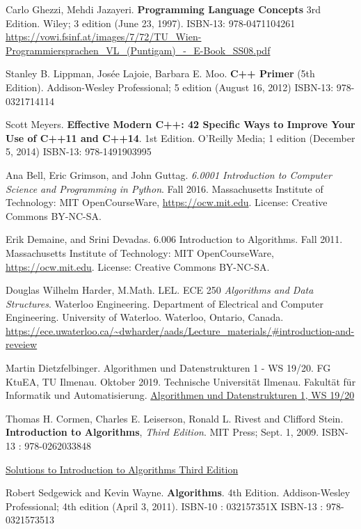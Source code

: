 \documentclass[10pt]{amsart}
\begin{document}
\begin{thebibliography}{9}
Carlo Ghezzi, Mehdi Jazayeri.  \textbf{Programming Language Concepts} 3rd Edition.  Wiley; 3 edition (June 23, 1997).  ISBN-13: 978-0471104261  \url{https://vowi.fsinf.at/images/7/72/TU_Wien-Programmiersprachen_VL_(Puntigam)_-_E-Book_SS08.pdf}

Stanley B. Lippman, Jos\'{e}e Lajoie, Barbara E. Moo. \textbf{C++ Primer} (5th Edition).  Addison-Wesley Professional; 5 edition (August 16, 2012) ISBN-13: 978-0321714114 

Scott Meyers.  \textbf{Effective Modern C++: 42 Specific Ways to Improve Your Use of C++11 and C++14}. 1st Edition.  O'Reilly Media; 1 edition (December 5, 2014)  ISBN-13: 978-1491903995

Ana Bell, Eric Grimson, and John Guttag. \emph{6.0001 Introduction to Computer Science and Programming in Python}. Fall 2016. Massachusetts Institute of Technology: MIT OpenCourseWare, \url{https://ocw.mit.edu}. License: Creative Commons BY-NC-SA.

Erik Demaine, and Srini Devadas. 6.006 Introduction to Algorithms. Fall 2011. Massachusetts Institute of Technology: MIT OpenCourseWare, \url{https://ocw.mit.edu}. License: Creative Commons BY-NC-SA.


Douglas Wilhelm Harder, M.Math. LEL. ECE 250 \emph{Algorithms and Data Structures}. Waterloo Engineering. Department of Electrical and Computer Engineering. University of Waterloo. Waterloo, Ontario, Canada. \url{https://ece.uwaterloo.ca/~dwharder/aads/Lecture_materials/#introduction-and-reveiew}

Martin Dietzfelbinger. Algorithmen und Datenstrukturen 1 - WS 19/20. FG KtuEA, TU Ilmenau. Oktober 2019. Technische Universit\"{a}t Ilmenau. Fakult\"{a}t f\"{u}r Informatik und Automatisierung. \href{https://www.tu-ilmenau.de/en/institute-of-theoretical-computer-science/lehre/lehre-ws-20192020/aud-1/}{Algorithmen und Datenstrukturen 1, WS 19/20}

Thomas H. Cormen, Charles E. Leiserson, Ronald L. Rivest and Clifford Stein.  \textbf{Introduction to Algorithms}, \emph{Third Edition}. MIT Press; Sept. 1, 2009.  ISBN-13 : 978-0262033848 

\href{https://walkccc.me/CLRS/}{Solutions to Introduction to Algorithms Third Edition}

Robert Sedgewick and Kevin Wayne. \textbf{Algorithms}. 4th Edition. Addison-Wesley Professional; 4th edition (April 3, 2011). ISBN-10 : 032157351X
ISBN-13 : 978-0321573513 



\end{thebibliography}
\end{document}
